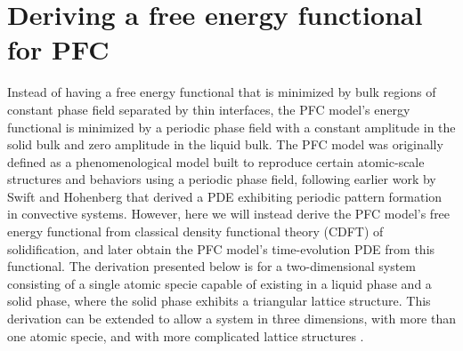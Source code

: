 
\section{Deriving a free energy functional for PFC}\label{sec:pfc_deriv}

Instead of having a free energy functional that is minimized by bulk regions of constant phase field separated by thin interfaces, the PFC model's energy functional is minimized by a periodic phase field with a constant amplitude in the solid bulk and zero amplitude in the liquid bulk. The PFC model was originally defined as a phenomenological model built to reproduce certain atomic-scale structures and behaviors using a periodic phase field, following earlier work by Swift and Hohenberg \cite{hohenberg77-2} that derived a PDE exhibiting periodic pattern formation in convective systems. However, here we will instead derive the PFC model's free energy functional from classical density functional theory (CDFT) of solidification, and later obtain the PFC model's time-evolution PDE from this functional. The derivation presented below is for a two-dimensional system consisting of a single atomic specie capable of existing in a liquid phase and a solid phase, where the solid phase exhibits a triangular lattice structure. This derivation can be extended to allow a system in three dimensions, with more than one atomic specie, and with more complicated lattice structures \cites{provatas07,provatas_PFC,greenwood10,greenwood11,greenwood11_2}.

